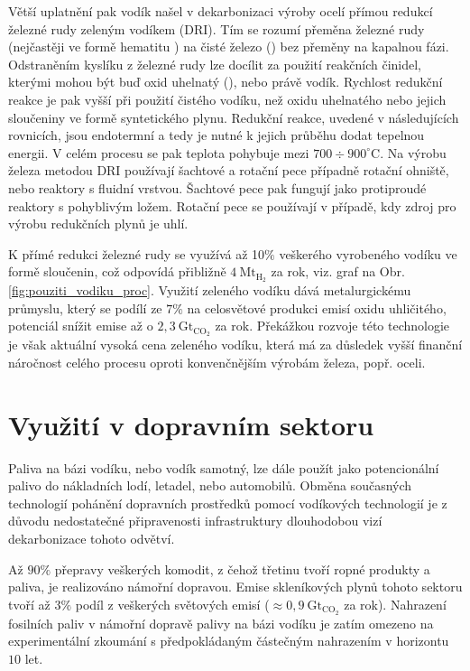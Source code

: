 Větší uplatnění pak vodík našel v dekarbonizaci výroby ocelí přímou redukcí železné rudy zeleným vodíkem (\acs{DRI}). Tím se rozumí přeměna železné rudy (nejčastěji ve formě hematitu ) na čisté železo () bez přeměny na kapalnou fázi. Odstraněním kyslíku z železné rudy lze docílit za použití reakčních činidel, kterými mohou být buď oxid uhelnatý (), nebo právě vodík. Rychlost redukční reakce je pak vyšší při použití čistého vodíku, než oxidu uhelnatého nebo jejich sloučeniny ve formě syntetického plynu. Redukční reakce, uvedené v následujících rovnicích, jsou endotermní a tedy je nutné k jejich průběhu dodat tepelnou energii. V celém procesu se pak teplota pohybuje mezi $700 \div 900^{\circ}\mathrm{C}$. \cite{Bhaskar2020}
Na výrobu železa metodou \acs{DRI} používají šachtové a rotační pece případně rotační ohniště, nebo reaktory s fluidní vrstvou. Šachtové pece pak fungují jako protiproudé reaktory s pohyblivým ložem. Rotační pece se používají v případě, kdy zdroj pro výrobu redukčních plynů je uhlí. \cite{Bhaskar2020}

K přímé redukci železné rudy se využívá až 10$\%$ veškerého vyrobeného vodíku ve formě sloučenin, což odpovídá přibližně $4\ \mathrm{Mt_{H_2}}$ za rok, viz. graf na Obr. \ref{fig:pouziti_vodiku_proc}. \cite{IEAfuture} Využití zeleného vodíku dává metalurgickému průmyslu, který se podílí ze $7\%$ na celosvětové produkci emisí oxidu uhličitého, potenciál snížit emise až o $2,3\ \mathrm{Gt_{CO_2}}$ za rok. Překážkou rozvoje této technologie je však aktuální vysoká cena zeleného vodíku, která má za důsledek vyšší finanční náročnost celého procesu oproti konvenčnějším výrobám železa, popř. oceli. \cite{Bhaskar2020}

\section{Využití v dopravním sektoru}
Paliva na bázi vodíku, nebo vodík samotný, lze dále použít jako potencionální palivo do nákladních lodí, letadel, nebo automobilů. Obměna současných technologií pohánění dopravních prostředků pomocí vodíkových technologií je z důvodu nedostatečné připravenosti infrastruktury dlouhodobou vizí dekarbonizace tohoto odvětví.

Až $90\%$ přepravy veškerých komodit, z čehož třetinu tvoří ropné produkty a paliva, je realizováno námořní dopravou. Emise skleníkových plynů tohoto sektoru tvoří až $3\%$ podíl z veškerých světových emisí ($\approx0,9\ \mathrm{Gt_{CO_2}}$ za rok). Nahrazení fosilních paliv v námořní dopravě palivy na bázi vodíku je zatím omezeno na experimentální zkoumání s předpokládaným částečným nahrazením v horizontu $10$ let. \cite{Griffiths2021,Bouman2017}

